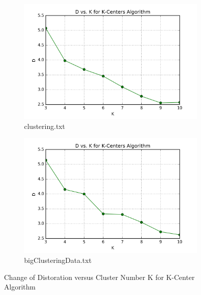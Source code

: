 \begin{figure}[H]
\centering
\centering
        \begin{subfigure}[b]{0.49\textwidth}
            \centering
            \includegraphics[width=\textwidth]{./figures/loss_clustering_kCenter.png}
            \caption{clustering.txt}\label{fig:6a}
        \end{subfigure}
        \hfill
        \begin{subfigure}[b]{0.49\textwidth}  
            \centering 
            \includegraphics[width=\textwidth]{./figures/loss_bigClustering_kCenter.png}
            \caption{bigClusteringData.txt}\label{fig:6b}
        \end{subfigure}
\caption{Change of Distoration versus Cluster Number K for K-Center Algorithm}
\label{fig:k-means-loss} 
\end{figure}

